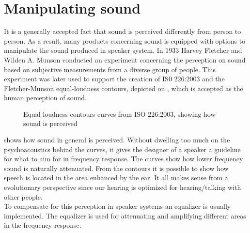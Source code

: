 \section{Manipulating sound}

It is a generally accepted fact that sound is perceived differently from person to person. As a result, many products concerning sound is equipped with options to manipulate the sound produced in speaker system. In 1933 Harvey Fletcher and Wilden A. Munson conducted an experiment concerning the perception on sound based on subjective measurements from a diverse group of people. This experiment was later used to support the creation of IS0 226:2003 and the Fletcher-Munson equal-loudness contours, depicted on , which is accepted as the human perception of sound.

\begin{figure}[H]
\centering
{}

\caption{Equal-loudness contours curves from ISO 226:2003, showing how sound is perceived}
\label{fig:SoundPerceived}
\end{figure}

 shows how sound in general is perceived. Without dwelling too much on the psychoacoustics behind the curves, it gives the designer of a speaker a guideline for what to aim for in frequency response. The curves show how lower frequency sound is naturally attenuated. From the contours it is possible to show how speech is located in the area enhanced by the ear. It all makes sense from a evolutionary perspective since our hearing is optimized for hearing/talking with other people. \\
To compensate for this perception in speaker systems an equalizer is usually implemented. The equalizer is used for attenuating and amplifying different areas in the frequency response. 

